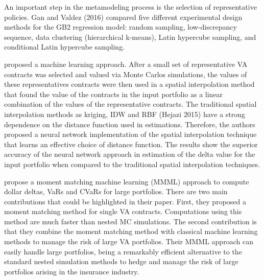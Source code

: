 An important step in the metamodeling process is the selection of representative policies. Gan and Valdez (2016) compared five different experimental design methods for the GB2 regression model: random sampling, low-discrepancy sequence, data clustering (hierarchical k-means), Latin hypercube sampling, and conditional Latin hypercube sampling.

\cite{hejazi2016neural} proposed a machine learning approach. After a small set of representative VA contracts was selected and valued via Monte Carlos simulations, the values of these representatives contracts were then used in a spatial interpolation method that found the value of the contracts in the input portfolio as a linear combination of the values of the representative contracts. The traditional spatial interpolation methods as kriging, IDW and RBF (Hejazi 2015) have a strong dependence on the distance function used in estimations. Therefore, the authors proposed a neural network implementation of the spatial interpolation technique that learns an effective choice of distance function. The results show the superior accuracy of the neural network approach in estimation of the delta value for the input portfolio when compared to the traditional spatial interpolation techniques.

\cite{xu2018moment} propose a moment matching machine learning (MMML) approach to compute dollar deltas, VaRs and CVaRs for large portfolios. There are two main contributions that could be highlighted in their paper. First, they proposed a moment matching method for single VA contracts. Computations using this method are much faster than nested MC simulations.
%
%
The second contribution is that they combine the moment matching method with classical machine learning methods to manage the risk of large VA portfolios. 
Their MMML approach can easily handle large portfolios, being a remarkably efficient alternative to the standard nested simulation methods to hedge and manage the risk of large portfolios arising in the insurance industry.


